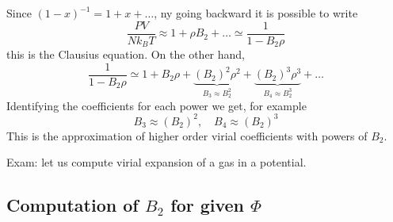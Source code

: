 \documentclass[../main/main.tex]{subfiles}
\begin{document}
Since \(  (1-x)^{-1} = 1 + x + \dots \), ny going backward it is possible to write
\begin{equation}
  \frac{PV}{N k_B T} \approx 1 + \rho B_2 + \dots \simeq \frac{1}{1-B_2 \rho }
\end{equation}
this is the Clausius equation. On the other hand,
\begin{equation}
  \frac{1}{1-B_2 \rho } \simeq  1 + B_2 \rho + \underbrace{(B_2)^2 \rho ^2}_{B_3 \approx B_2^2}  + \underbrace{(B_2)^3 \rho ^3}_{B_4 \approx B_2^3} + \dots
\end{equation}
Identifying the coefficients for each power we get, for example
\begin{equation}
  B_3 \approx (B_2)^2, \quad B_4 \approx (B_2)^3
\end{equation}
This is the approximation of higher order virial coefficients with powers of \( B_2 \).
\begin{example}
Exam: let us compute virial expansion of a gas in a potential.
\end{example}

\subsection{Computation of \( B_2 \) for given \( \Phi  \)}
\end{document}
